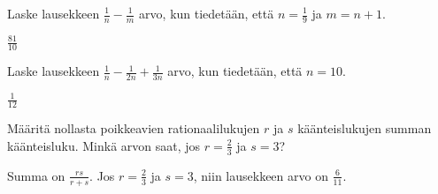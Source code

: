 \begin{tehtavasivu}

\begin{tehtava}
	Laske lausekkeen $\frac{1}{n}-\frac{1}{m}$ arvo, kun tiedetään, että $n = \frac{1}{9}$ ja $m=n+1$.
	\begin{vastaus}
		$\frac{81}{10}$
	\end{vastaus}
\end{tehtava}

\begin{tehtava}
	Laske lausekkeen $\frac{1}{n}-\frac{1}{2n}+\frac{1}{3n}$ arvo, kun tiedetään, että $n = 10$.
	\begin{vastaus}
		$\frac{1}{12}$
	\end{vastaus}
\end{tehtava}
\begin{tehtava}
	Määritä nollasta poikkeavien rationaalilukujen \(r\) ja \(s\) käänteislukujen summan käänteisluku. Minkä arvon saat, jos \(r=\frac{2}{3}\) ja \(s=3\)?
	\begin{vastaus}
		Summa on $\frac{rs}{r+s}$. Jos \(r=\frac{2}{3}\) ja \(s=3\), niin lausekkeen arvo on \(\frac{6}{11}\).
	\end{vastaus}
\end{tehtava}


\end{tehtavasivu}
